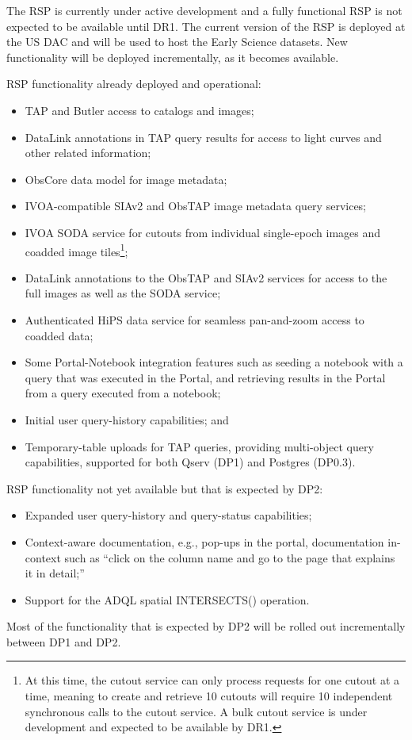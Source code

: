 The RSP is currently under active development and a fully functional RSP is not expected to be available until DR1.
The current version of the RSP is deployed at the US DAC and will be used to host the Early Science datasets.
New functionality will be deployed incrementally, as it becomes available.

RSP functionality already deployed and operational:
\begin{itemize}
\item TAP and Butler access to catalogs and images;
\item DataLink annotations in TAP query results for access to light curves and other related information;
\item ObsCore data model for image metadata;
\item IVOA-compatible SIAv2 and ObsTAP image metadata query services;
\item IVOA SODA service for cutouts from individual single-epoch images and coadded image tiles\footnote{At this time, the cutout service can only process requests for one cutout at a time, meaning to create and retrieve 10 cutouts will require 10 independent synchronous calls to the cutout service.
A bulk cutout service is under development and expected to be available by DR1.};
\item DataLink annotations to the ObsTAP and SIAv2 services for access to the full images as well as the SODA service;
\item Authenticated HiPS data service for seamless pan-and-zoom access to coadded data;
\item Some Portal-Notebook integration features such as seeding a notebook with a query that was executed in the Portal, and retrieving results in the Portal from a query executed from a notebook;
\item Initial user query-history capabilities; and
\item Temporary-table uploads for TAP queries, providing multi-object query capabilities, supported for both Qserv (DP1) and Postgres (DP0.3).
\end{itemize}

RSP functionality not yet available but that is expected by DP2:
\begin{itemize}
\item Expanded user query-history and query-status capabilities;
\item Context-aware documentation, e.g., pop-ups in the portal, documentation in-context such as ``click on the column name and go to the page that explains it in detail;''
\item Support for the ADQL spatial INTERSECTS() operation.
\end{itemize}
Most of the functionality  that is expected by DP2 will be rolled out incrementally between DP1 and DP2.

